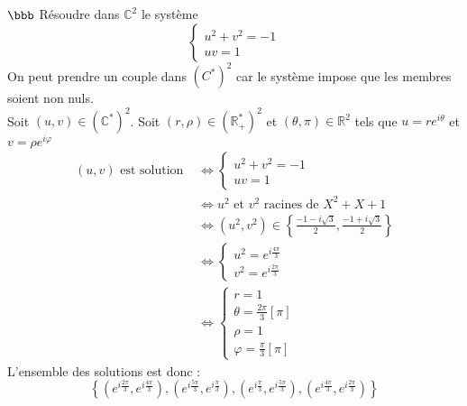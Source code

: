 \documentclass[11pt]{article}
\begin{document}
\begin{exercice}{$\bbb$}{}
    Résoudre dans $\mathbb{C}^2$ le système
    \begin{equation*}
        \begin{cases}
            u^2 + v^2 = -1\\
            uv = 1
        \end{cases}
    \end{equation*}
    \tcblower
    On peut prendre un couple dans $(C^*)^2$ car le système impose que les membres soient non nuls.\\
    Soit $(u,v)\in(\mathbb{C}^*)^2$. Soit $(r,\rho)\in(\mathbb{R}_+^*)^2$ et $(\theta, \pi)\in\mathbb{R}^2$ tels que $u=re^{i\theta}$ et $v=\rho e^{i\varphi}$
    \begin{align*}
        (u,v) \text{ est solution } &\iff \begin{cases}
            u^2 + v^2 = -1\\
            uv = 1
        \end{cases}\\
        &\iff u^2 \text{ et } v^2 \text{ racines de } X^2 + X + 1\\
        &\iff(u^2, v^2)\in\left\{\frac{-1-i\sqrt{3}}{2}, \frac{-1+i\sqrt{3}}{2}\right\}\\
        &\iff\begin{cases}
            u^2 = e^{i\frac{4\pi}{3}}\\
            v^2 = e^{i\frac{2\pi}{3}}
        \end{cases}\\
        &\iff\begin{cases}
            r = 1\\
            \theta = \frac{2\pi}{3}[\pi]\\
            \rho = 1\\
            \varphi = \frac{\pi}{3}[\pi]
        \end{cases}
    \end{align*}
    L'ensemble des solutions est donc :
    \begin{equation*}
        \left\{(e^{i\frac{2\pi}{3}}, e^{i\frac{4\pi}{3}}), (e^{i\frac{5\pi}{3}}, e^{i\frac{\pi}{3}}), (e^{i\frac{\pi}{3}}, e^{i\frac{5\pi}{3}}), (e^{i\frac{4\pi}{3}}, e^{i\frac{2\pi}{3}})\right\}
    \end{equation*}
\end{exercice}

\pagebreak
\end{document}
